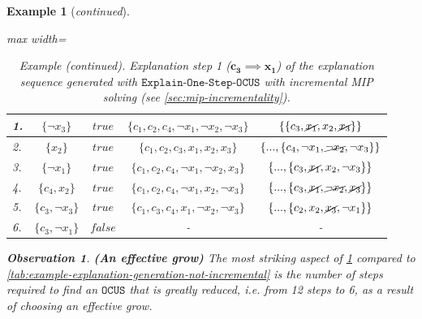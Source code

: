 \documentclass[twoside,11pt]{article}
\newtheorem{example}{Example}
\newtheorem{observation}[obs]{Observation}
\newcommand\comment[1]{\marginpar{\tiny #1}}
\renewcommand\comment[1]{#1}
\newcommand{\tias}[1]{{\comment{\color{blue}Tias:#1}}}
\newcommand\mm[1]{\ensuremath{#1}\xspace}
\newcommand\call[1]{\mm{\texttt{#1}}}
\newcommand\comus{\mm{\call{OCUS}}}
\newcommand\onestepo{\ensuremath{\call{Explain-One-Step-OCUS}}\xspace}
\begin{document}
\begin{example}[\textit{continued}]
\begin{table}[!ht]
\begin{adjustbox}{max width=\textwidth}
\begin{tabular}{lcccc}
		1. & $\{\lnot x_3\}$                     & $\mathit{true}$  & $\{c_1 , c_2 , c_4, \lnot x_1 , \lnot x_2 ,  \lnot x_3 \}$ & $\{ \{c_3, \cancel{x_1} , x_2 , \cancel{x_3} \}\}$   
		                            \\  		\midrule
		2. & $\{x_2\}$                     & $\mathit{true}$  & $\{c_1, c_2, c_3, x_1, x_2, x_3 \}$ & $\{ ..., \{c_4, \lnot x_1 ,\cancel{\lnot x_2} , \lnot x_3 \}\}$                               \\  
		\midrule %
		3. & $\{ \lnot x_1\}$                    & $\mathit{true}$  & $\{c_1, c_2, c_4, \lnot x_1, \lnot x_2, x_3 \}$            & $\{ ..., \{c_3, \cancel{x_1}, x_2, \lnot x_3 \}\}$                                \\
		\midrule %
		4. & $\{c_4, x_2\}$                      & $\mathit{true}$  & $\{  c_1 , c_2 , c_4, \lnot x_1 , x_2 , \lnot x_3\}$       & $\{ ..., \{ c_3, \cancel{x_1} , \cancel{\lnot x_2} , \cancel{x_3} \}\}$                        \\ 
		\midrule %
		5. & $\{c_3, \lnot x_3\}$                      & $\mathit{true}$  & $\{  c_1, c_3, c_4, x_1 ,\lnot x_2 , \lnot x_3\}$       & $\{ ..., \{c_2, x_2, \cancel{x_3},  \lnot x_1 \}\}$                        \\ 
		\midrule
		6. & $\{c_3, \lnot x_1\}$  & $\mathit{false}$ & - & - \\%
	\end{tabular}
\end{adjustbox}
	\caption{\textit{Example (continued)}. Explanation step 1 ($\mathbf{c_3 \implies x_1}$) of the explanation sequence generated with \onestepo with incremental MIP solving (see \cref{sec:mip-incrementality}). }
	\label{tab:example-explanation-generation:incr:step1}
\end{table}
\begin{observation}\textbf{(An effective grow)}
 The most striking aspect of \cref{tab:example-explanation-generation:incr:step1} compared to \cref{tab:example-explanation-generation-not-incremental} is the number of steps required to find an \comus that is greatly reduced, i.e. from 12 steps to 6, as a result of choosing an effective grow. %
\end{observation}


\end{example}
\end{document}
